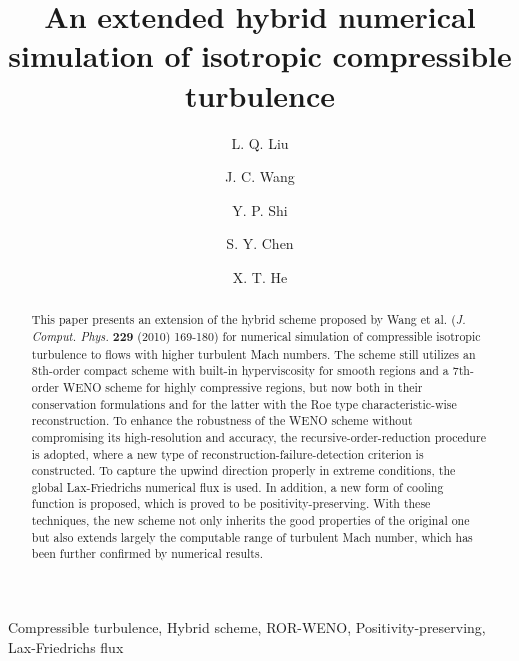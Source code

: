 \documentclass[review]{elsarticle}
\begin{document}
\begin{frontmatter}

\title{\textbf{An extended hybrid numerical simulation of isotropic compressible turbulence}}

\author[mymainaddress]{L. Q. Liu}
\author[mysecondaryaddress]{J. C. Wang}
\author[mymainaddress]{Y. P. Shi}
\author[mymainaddress,mysecondaryaddress]{S. Y. Chen}
\author[mymainaddress,mythirdaryaddress]{X. T. He}

\address[mymainaddress]{State Key Laboratory for Turbulence and Complex Systems, Center for Applied Physics and Technology, College of Engineering, Peking University, Beijing 100871, China}
\address[mysecondaryaddress]{Department of Mechanics and Aerospace Engineering, Southern University of Science and Technology, Shenzhen 518055, China}
\address[mythirdaryaddress]{Institute of Applied Physics and Computational Mathematics, Beijing 100088, China}

\begin{abstract}
  This paper presents an extension of the hybrid scheme proposed by Wang et al. (\textit{J. Comput. Phys.} \textbf{229} (2010) 169-180) for numerical simulation of compressible isotropic turbulence to flows with higher turbulent Mach numbers. The scheme still utilizes an 8th-order compact scheme with built-in hyperviscosity for smooth regions and a 7th-order WENO scheme for highly compressive regions, but now both in their conservation formulations and for the latter with the Roe type characteristic-wise reconstruction. To enhance the robustness of the WENO scheme without compromising its high-resolution and accuracy, the recursive-order-reduction procedure is adopted, where a new type of reconstruction-failure-detection criterion is constructed. To capture the upwind direction properly in extreme conditions, the global Lax-Friedrichs numerical flux is used. In addition, a new form of cooling function is proposed, which is proved to be positivity-preserving. With these techniques, the new scheme not only inherits the good properties of the original one but also extends largely the computable range of turbulent Mach number, which has been further confirmed by numerical results.
\end{abstract}

\begin{keyword}
 Compressible turbulence, Hybrid scheme, ROR-WENO, Positivity-preserving, Lax-Friedrichs flux
\end{keyword}

\end{frontmatter}
\end{document}
